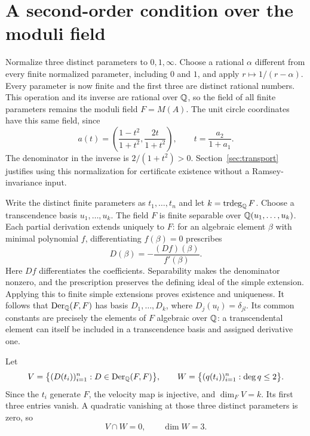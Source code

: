 \section{A second-order condition over the moduli field}\label{sec:second-order}

Normalize three distinct parameters to $0,1,\infty$. Choose a rational
$\alpha$ different from every finite normalized parameter, including
$0$ and $1$, and apply
$r\mapsto1/(r-\alpha)$. Every parameter is now finite and the first
three are distinct rational numbers. This operation and its inverse
are rational over $\mathbb Q$, so the field of all finite parameters remains
the moduli field $F=M(A)$. The unit circle coordinates have this same
field, since
\[
 a(t)=\left(\frac{1-t^2}{1+t^2},\frac{2t}{1+t^2}\right),\qquad
 t=\frac{a_2}{1+a_1}.
\]
The denominator in the inverse is $2/(1+t^2)>0$.
Section~\ref{sec:transport} justifies using this normalization for
certificate existence without a Ramsey-invariance input.

Write the distinct finite parameters as $t_1,\ldots,t_n$ and let
$k=\operatorname{trdeg}_\mathbb Q F$. Choose a transcendence basis $u_1,\ldots,u_k$.
The field $F$ is finite separable over $\mathbb Q(u_1,\ldots,u_k)$.
Each partial derivation extends uniquely to $F$: for an algebraic
element $\beta$ with minimal polynomial $f$, differentiating
$f(\beta)=0$ prescribes
\[
 D(\beta)=-\frac{(Df)(\beta)}{f'(\beta)}.
\]
Here $Df$ differentiates the coefficients. Separability makes the
denominator nonzero, and the prescription preserves the defining
ideal of the simple extension. Applying this to finite simple
extensions proves existence and uniqueness. It follows that
$\operatorname{Der}_\mathbb Q(F,F)$ has basis $D_1,\ldots,D_k$, where
$D_j(u_l)=\delta_{jl}$. Its common constants are precisely the
elements of $F$ algebraic over $\mathbb Q$: a transcendental element can
itself be included in a transcendence basis and assigned derivative
one.

Let
\begin{equation}\label{eq:velocity-space}
 V=\bigl\{(D(t_i))_{i=1}^n:D\in\operatorname{Der}_\mathbb Q(F,F)\bigr\},\qquad
 W=\bigl\{(q(t_i))_{i=1}^n:\deg q\le2\bigr\}.
\end{equation}
Since the $t_i$ generate $F$, the velocity map is injective, and
$\dim_F V=k$. Its first three entries vanish. A quadratic vanishing
at those three distinct parameters is zero, so
\begin{equation}\label{eq:transversality}
 V\cap W=0,\qquad \dim W=3.
\end{equation}

